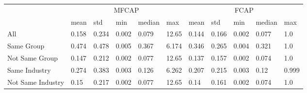 \begin{tabular}{lllllllllll}
\toprule
 & \multicolumn{5}{c}{MFCAP} & \multicolumn{5}{c}{FCAP} \\
\cmidrule(lr){2-6}  \cmidrule(lr){7-11} 
 &       mean &    std &    min & median &    max &         mean &    std &    min & median &    max \\
\midrule
All               &      0.158 &  0.234 &  0.002 &  0.079 &  12.65 &        0.144 &  0.166 &  0.002 &  0.077 &    1.0 \\
Same Group        &      0.474 &  0.478 &  0.005 &  0.367 &  6.174 &        0.346 &  0.265 &  0.004 &  0.321 &    1.0 \\
Not Same Group    &      0.147 &  0.212 &  0.002 &  0.077 &  12.65 &        0.137 &  0.157 &  0.002 &  0.074 &    1.0 \\
Same Industry     &      0.274 &  0.383 &  0.003 &  0.126 &  6.262 &        0.207 &  0.215 &  0.003 &   0.12 &  0.999 \\
Not Same Industry &       0.15 &  0.217 &  0.002 &  0.077 &  12.65 &         0.14 &  0.161 &  0.002 &  0.074 &    1.0 \\
\bottomrule
\end{tabular}
